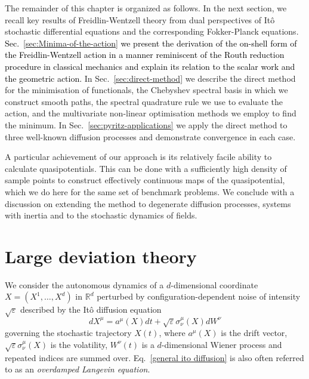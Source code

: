 The remainder of this chapter is organized as follows. In the next section,
we recall key results of Freidlin-Wentzell theory from dual perspectives
of Itô stochastic differential equations and the corresponding Fokker-Planck
equations.\textcolor{black}{{} Sec.~\ref{sec:Minima-of-the-action}
we present the derivation of the on-shell form of the Freidlin-Wentzell
action in a manner reminiscent of the Routh reduction procedure in
classical mechanics and explain its relation to the scalar work and
the geometric action. }In Sec.~\ref{sec:direct-method} we describe
the direct method for the minimisation of functionals, the Chebyshev
spectral basis in which we construct smooth paths, the spectral quadrature
rule we use to evaluate the action, and the multivariate non-linear
optimisation methods we employ to find the minimum. In Sec.~\ref{sec:pyritz-applications}
we apply the direct method to three well-known diffusion processes
and demonstrate convergence in each case. 

A particular achievement of our approach is its relatively facile
ability to calculate quasipotentials. This can be done with a sufficiently
high density of sample points to construct effectively continuous
maps of the quasipotential, which we do here for the same set of benchmark
problems. We conclude with a discussion on extending the method to
degenerate diffusion processes, systems with inertia and to the stochastic
dynamics of fields. 

\section{Large deviation theory} \label{sec:fwtheory}

We consider the autonomous dynamics of a $d$-dimensional coordinate
$X=(X^{1},\ldots,X^{d})$ in $\mathbb{R}^{d}$ perturbed by configuration-dependent
noise of intensity $\sqrt{\varepsilon}$ described by the Itô diffusion
equation \citep{oksendalStochasticDifferentialEquations2003, shreveStochasticCalculusFinance2005}
\begin{equation}
dX^{\mu}=a^{\mu}(X)dt+\sqrt{\varepsilon}\sigma_{\nu}^{\mu}(X)dW^{\nu}\label{general ito diffusion}
\end{equation}
governing the stochastic trajectory $X(t)$, where $a^{\mu}(X)$ is
the drift vector, $\sqrt{\varepsilon}\sigma_{\nu}^{\mu}(X)$ is the
volatility, $W^{\nu}(t)$ is a $d$-dimensional Wiener process and
repeated indices are summed over.  Eq.~\ref{general ito diffusion} is also often referred to as an \textit{overdamped Langevin equation}.

